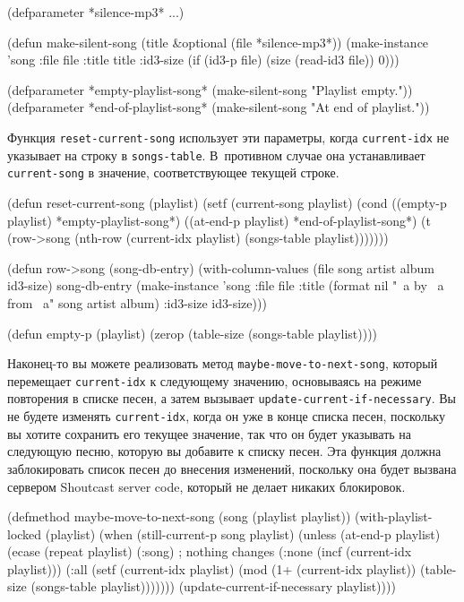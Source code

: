 \begin{myverb}
(defparameter *silence-mp3* ...)

(defun make-silent-song (title &optional (file *silence-mp3*))
  (make-instance
   'song 
   :file file
   :title title
   :id3-size (if (id3-p file) (size (read-id3 file)) 0)))

(defparameter *empty-playlist-song* (make-silent-song "Playlist empty."))
(defparameter *end-of-playlist-song* (make-silent-song "At end of playlist."))
\end{myverb}

Функция \lstinline{reset-current-song} использует эти параметры, когда \lstinline{current-idx} не
указывает на строку в \lstinline{songs-table}.  В~противном случае она устанавливает
\lstinline{current-song} в значение, соответствующее текущей строке.

\begin{myverb}
(defun reset-current-song (playlist)
  (setf
   (current-song playlist) 
   (cond
     ((empty-p playlist) *empty-playlist-song*)
     ((at-end-p playlist) *end-of-playlist-song*)
     (t (row->song (nth-row (current-idx playlist) (songs-table playlist)))))))

(defun row->song (song-db-entry)
  (with-column-values (file song artist album id3-size) song-db-entry
    (make-instance
     'song
     :file file
     :title (format nil "~a by ~a from ~a" song artist album)
     :id3-size id3-size)))

(defun empty-p (playlist)
  (zerop (table-size (songs-table playlist))))
\end{myverb}

Наконец-то вы можете реализовать метод \lstinline{maybe-move-to-next-song}, который перемещает
\lstinline{current-idx} к следующему значению, основываясь на режиме повторения в списке песен,
а затем вызывает \lstinline{update-current-if-necessary}.  Вы не будете изменять
\lstinline{current-idx}, когда он уже в конце списка песен, поскольку вы хотите сохранить его
текущее значение, так что он будет указывать на следующую песню, которую вы добавите к
списку песен.  Эта функция должна заблокировать список песен до внесения изменений,
поскольку она будет вызвана сервером Shoutcast server code, который не делает никаких
блокировок.

\begin{myverb}
(defmethod maybe-move-to-next-song (song (playlist playlist))
  (with-playlist-locked (playlist)
    (when (still-current-p song playlist)
      (unless (at-end-p playlist)
        (ecase (repeat playlist)
          (:song) ; nothing changes
          (:none (incf (current-idx playlist)))
          (:all  (setf (current-idx playlist)
                       (mod (1+ (current-idx playlist))
                            (table-size (songs-table playlist)))))))
      (update-current-if-necessary playlist))))
\end{myverb}

